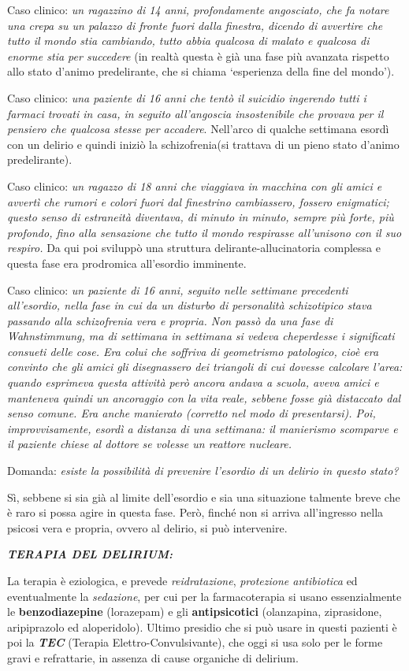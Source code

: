 \documentclass[]{article}
\begin{document}
Caso clinico: \emph{un ragazzino di 14 anni, profondamente angosciato,
che fa notare una crepa su un palazzo di fronte fuori dalla finestra,
dicendo di avvertire che tutto il mondo stia cambiando, tutto abbia
qualcosa di malato e qualcosa di enorme stia per succedere} (in realtà
questa è già una fase più avanzata rispetto allo stato d'animo
predelirante, che si chiama `esperienza della fine del mondo').

Caso clinico: \emph{una paziente di 16 anni che tentò il suicidio
ingerendo tutti i farmaci trovati in casa, in seguito all'angoscia
insostenibile che provava per il pensiero che qualcosa stesse per
accadere}. Nell'arco di qualche settimana esordì con un delirio e quindi
iniziò la schizofrenia(si trattava di un pieno stato d'animo
predelirante).

Caso clinico: \emph{un ragazzo di 18 anni che viaggiava in macchina con
gli amici e avvertì che rumori e colori fuori dal finestrino
cambiassero, fossero enigmatici; questo senso di estraneità diventava,
di minuto in minuto, sempre più forte, più profondo, fino alla
sensazione che tutto il mondo respirasse all'unisono con il suo
respiro.} Da qui poi sviluppò una struttura delirante-allucinatoria
complessa e questa fase era prodromica all'esordio imminente.

Caso clinico: \emph{un paziente di 16 anni, seguito nelle settimane
precedenti all'esordio, nella fase in cui da un disturbo di personalità
schizotipico stava passando alla schizofrenia vera e propria. Non passò
da una fase di Wahnstimmung, ma di settimana in settimana si vedeva
cheperdesse i significati consueti delle cose. Era colui che soffriva di
geometrismo patologico, cioè era convinto che gli amici gli disegnassero
dei triangoli di cui dovesse calcolare l'area: quando esprimeva questa
attività però ancora andava a scuola, aveva amici e manteneva quindi un
ancoraggio con la vita reale, sebbene fosse già distaccato dal senso
comune. Era anche manierato (corretto nel modo di presentarsi). Poi,
improvvisamente, esordì a distanza di una settimana: il manierismo
scomparve e il paziente chiese al dottore se volesse un reattore
nucleare.}

Domanda: \emph{esiste la possibilità di prevenire l'esordio di un
delirio in questo stato? }

Sì, sebbene si sia già al limite dell'esordio e sia una situazione
talmente breve che è raro si possa agire in questa fase. Però, finché
non si arriva all'ingresso nella psicosi vera e propria, ovvero al
delirio, si può intervenire.

\textbf{\emph{TERAPIA DEL DELIRIUM:}}

La terapia è eziologica, e prevede \emph{reidratazione},
\emph{protezione antibiotica} ed eventualmente la \emph{sedazione}, per
cui per la farmacoterapia si usano essenzialmente le
\textbf{benzodiazepine} (lorazepam) e gli \textbf{antipsicotici}
(olanzapina, ziprasidone, aripiprazolo ed aloperidolo). Ultimo presidio
che si può usare in questi pazienti è poi la \textbf{\emph{TEC}}
(Terapia Elettro-Convulsivante), che oggi si usa solo per le forme gravi
e refrattarie, in assenza di cause organiche di delirium.
\end{document}
